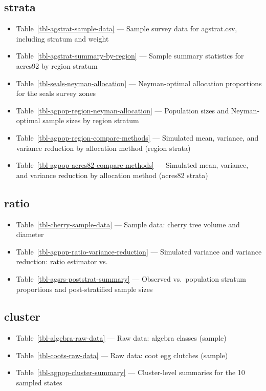 \documentclass[
  letterpaper,
  DIV=11,
  numbers=noendperiod]{scrreprt}
\providecommand{\tightlist}{%
  \setlength{\itemsep}{0pt}\setlength{\parskip}{0pt}}
\renewcommand{\[}{\begin{equation}}
\renewcommand{\]}{\end{equation}}
\begin{document}
\subsection{strata}\label{strata-1}

\begin{itemize}
\tightlist
\item
  Table~\ref{tbl-agstrat-sample-data} --- Sample survey data for
  agstrat.csv, including stratum and weight
\item
  Table~\ref{tbl-agstrat-summary-by-region} --- Sample summary
  statistics for acres92 by region stratum
\item
  Table~\ref{tbl-seals-neyman-allocation} --- Neyman-optimal allocation
  proportions for the seals survey zones
\item
  Table~\ref{tbl-agpop-region-neyman-allocation} --- Population sizes
  and Neyman-optimal sample sizes by region stratum
\item
  Table~\ref{tbl-agpop-region-compare-methods} --- Simulated mean,
  variance, and variance reduction by allocation method (region strata)
\item
  Table~\ref{tbl-agpop-acres82-compare-methods} --- Simulated mean,
  variance, and variance reduction by allocation method (acres82 strata)
\end{itemize}

\subsection{ratio}\label{ratio-1}

\begin{itemize}
\tightlist
\item
  Table~\ref{tbl-cherry-sample-data} --- Sample data: cherry tree volume
  and diameter
\item
  Table~\ref{tbl-agpop-ratio-variance-reduction} --- Simulated variance
  and variance reduction: ratio estimator vs.
\item
  Table~\ref{tbl-agsrs-poststrat-summary} --- Observed vs.~population
  stratum proportions and post-stratified sample sizes
\end{itemize}

\subsection{cluster}\label{cluster-1}

\begin{itemize}
\tightlist
\item
  Table~\ref{tbl-algebra-raw-data} --- Raw data: algebra classes
  (sample)
\item
  Table~\ref{tbl-coots-raw-data} --- Raw data: coot egg clutches
  (sample)
\item
  Table~\ref{tbl-agpop-cluster-summary} --- Cluster-level summaries for
  the 10 sampled states
\end{itemize}
\end{document}
